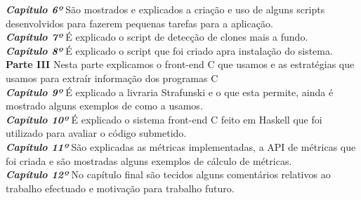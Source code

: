\textbf{\textit{Capítulo 6º}} São mostrados e explicados a criação e uso de alguns scripts desenvolvidos para fazerem pequenas tarefas para a aplicação.\\

\textbf{\textit{Capítulo 7º}} É explicado o script de detecção de clones mais a fundo.\\

\textbf{\textit{Capítulo 8º}} É explicado o script que foi criado apra instalação do sistema.\\

\textbf{Parte III} Nesta parte explicamos o front-end C que usamos e as estratégias que usamos para extraír informação dos programas C\\

\textbf{\textit{Capítulo 9º}} É explicado a livraria Strafunski e o que esta permite, ainda é mostrado alguns exemplos de como a usamos.\\

\textbf{\textit{Capítulo 10º}} É explicado o sistema front-end C feito em Haskell que foi utilizado para avaliar o código submetido.\\

\textbf{\textit{Capítulo 11º}} São explicadas as métricas implementadas, a API de métricas que foi criada e são mostradas alguns exemplos de cálculo de métricas.\\

\textbf{\textit{Capítulo 12º}} No capítulo final são tecidos alguns comentários relativos ao trabalho efectuado e motivação para trabalho futuro.\\

